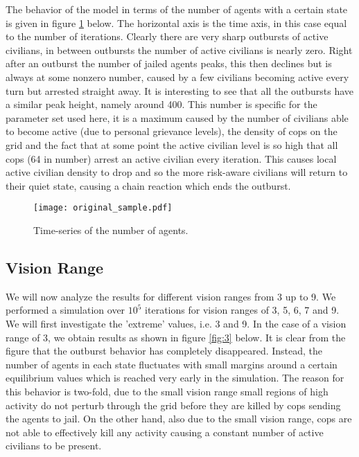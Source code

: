 \documentclass[11pt,a4paper,onecolumn]{article}
\begin{document}
The behavior of the model in terms of the number of agents with a certain state is given in figure \ref{fig:6} below. The horizontal axis is the time axis, in this case equal to the number of iterations. Clearly there are very sharp outbursts of active civilians, in between outbursts the number of active civilians is nearly zero. Right after an outburst the number of jailed agents peaks, this then declines but is always at some nonzero number, caused by a few civilians becoming active every turn but arrested straight away. It is interesting to see that all the outbursts have a similar peak height, namely around 400. This number is specific for the parameter set used here, it is a maximum caused by the number of civilians able to become active (due to personal grievance levels), the density of cops on the grid and the fact that at some point the active civilian level is so high that all cops (64 in number) arrest an active civilian every iteration. This causes local active civilian density to drop and so the more risk-aware civilians will return to their quiet state, causing a chain reaction which ends the outburst.

\begin{figure}[H]
  \centering
  \texttt{[image: original\_sample.pdf]}
  \caption{Time-series of the number of agents.}
  \label{fig:6}
\end{figure}

\subsection{Vision Range}
We will now analyze the results for different vision ranges from 3 up to 9. We performed a simulation over $10^5$ iterations for vision ranges of 3, 5, 6, 7 and 9. We will first investigate the 'extreme' values, i.e. 3 and 9. In the case of a vision range of 3, we obtain results as shown in figure \ref{fig:3} below. It is clear from the figure that the outburst behavior has completely disappeared. Instead, the number of agents in each state fluctuates with small margins around a certain equilibrium values which is reached very early in the simulation. The reason for this behavior is two-fold, due to the small vision range small regions of high activity do not perturb through the grid before they are killed by cops sending the agents to jail. On the other hand, also due to the small vision range, cops are not able to effectively kill any activity causing a constant number of active civilians to be present.
\end{document}
